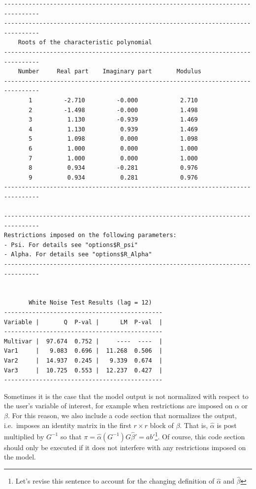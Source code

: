 \documentclass[article]{jss}
\begin{document}
\begin{verbatim}
--------------------------------------------------------------------------------
--------------------------------------------------------------------------------
    Roots of the characteristic polynomial                                                           
--------------------------------------------------------------------------------
    Number     Real part    Imaginary part       Modulus                                             
--------------------------------------------------------------------------------
       1         -2.710         -0.000            2.710                                        
       2         -1.498         -0.000            1.498                                        
       3          1.130         -0.939            1.469                                        
       4          1.130          0.939            1.469                                        
       5          1.098          0.000            1.098                                        
       6          1.000          0.000            1.000                                        
       7          1.000          0.000            1.000                                        
       8          0.934         -0.281            0.976                                        
       9          0.934          0.281            0.976                                        
--------------------------------------------------------------------------------

--------------------------------------------------------------------------------
Restrictions imposed on the following parameters:
- Psi. For details see "options$R_psi"
- Alpha. For details see "options$R_Alpha"
--------------------------------------------------------------------------------


       White Noise Test Results (lag = 12)
---------------------------------------------
Variable |       Q  P-val |      LM  P-val  |
---------------------------------------------
Multivar |  97.674  0.752 |     ----  ----  |
Var1     |   9.083  0.696 |  11.268  0.506  |
Var2     |  14.937  0.245 |   9.339  0.674  |
Var3     |  10.725  0.553 |  12.237  0.427  |
---------------------------------------------
\end{verbatim}

Sometimes it is the case that the model output is not normalized with respect to the user's variable of interest, for example when restrictions are imposed on $\alpha$ or $\beta$. For this reason, we also include a code section that normalizes the output, i.e.\ imposes an identity matrix in the first $r \times r$ block of $\beta$. 
That is, $\hat{\alpha}$ is post multiplied by $G^{-1}$ so that $\pi= \hat{\alpha}(G^{-1})G\hat{\beta}' = ab'$\footnote{Let's revise this sentence to account for the changing definition of $\hat{\alpha}$ and $\hat{\beta}$}.
Of course, this code section should only be executed if it does not interfere with any restrictions imposed on the model.
\end{document}
